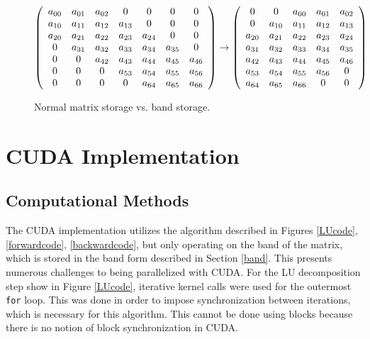 \documentclass[12pt]{article}
\begin{document}
\begin{figure}[H]
\caption{Normal matrix storage vs. band storage.}
\label{bandstorage}
$$
\left(
\begin{array}{c c c c c c c}
a_{00} & a_{01} & a_{02} & 0 & 0 & 0 & 0\\
a_{10} & a_{11} & a_{12} & a_{13} & 0 & 0 & 0\\
a_{20} & a_{21} & a_{22} & a_{23} & a_{24} & 0 & 0\\
     0 & a_{31} & a_{32} & a_{33} & a_{34} & a_{35} & 0\\
     0 &      0 & a_{42} & a_{43} & a_{44} & a_{45} & a_{46}\\
     0 &      0 &      0 & a_{53} & a_{54} & a_{55} & a_{56}\\
     0 &      0 &      0 &      0 & a_{64} & a_{65} & a_{66}\\
\end{array}
\right)
\rightarrow
\left(
\begin{array}{c c c c c}
     0 &      0 & a_{00} & a_{01} & a_{02}\\
     0 & a_{10} & a_{11} & a_{12} & a_{13}\\
a_{20} & a_{21} & a_{22} & a_{23} & a_{24}\\
a_{31} & a_{32} & a_{33} & a_{34} & a_{35}\\
a_{42} & a_{43} & a_{44} & a_{45} & a_{46}\\
a_{53} & a_{54} & a_{55} & a_{56} & 0     \\
a_{64} & a_{65} & a_{66} & 0      & 0
\end{array}
\right)
$$
\end{figure}

\section{CUDA Implementation}
\label{sec:implimentation}

\subsection{Computational Methods}

The CUDA implementation utilizes the algorithm described in Figures
\ref{LUcode}, \ref{forwardcode}, \ref{backwardcode}, but only operating on the
band of the matrix, which is stored in the band form described in Section
\ref{band}. This presents numerous challenges to being parallelized with CUDA.
For the LU decomposition step show in Figure \ref{LUcode}, iterative kernel
calls were used for the outermost \texttt{for} loop. This was done in order to
impose synchronization between iterations, which is necessary for this
algorithm. This cannot be done using blocks because there is no notion of block
synchronization in CUDA.
\end{document}

